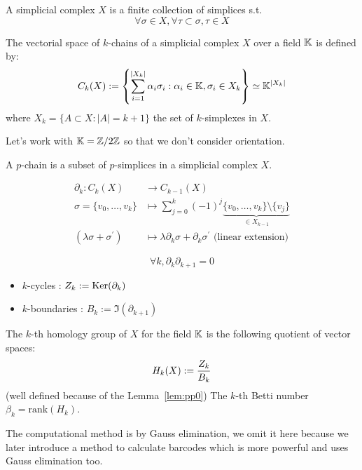 \begin{definition}
  A simplicial complex $X$ is a finite collection of simplices s.t.
  $$
  \forall \sigma\in X, \forall \tau\subset\sigma, \tau\in X
  $$
\end{definition}

\begin{definition}
  The vectorial space of $k$-chains of a simplicial complex $X$ over a field $\mathbb{K}$ is defined by:
  $$
  C_k(X) := \left\{\sum_{i=1}^{\left|X_k\right|} \alpha_i \sigma_i: \alpha_i \in \mathbb{K}, \sigma_i \in X_k\right\}
  \simeq \mathbb{K}^{|X_k|}
  $$
  where $X_k = \{A\subset X : |A|=k+1\}$ the set of $k$-simplexes in $X$.
\end{definition}
\RM Let's work with $\mathbb{K} = \mathbb{Z}/2\mathbb{Z}$ so that we don't consider orientation.

\begin{definition}[$p$-chain]
  A $p$-chain is a subset of $p$-simplices in a simplicial complex $X$.
\end{definition}

\begin{definition}
  $$
  \begin{aligned}
  \partial_k: C_k(X) & \to C_{k-1}(X) \\
  \sigma=\{ v_0, \ldots, v_k \} & \mapsto \sum_{j=0}^k(-1)^j \underbrace{ \{v_0,\ldots,v_k \} \setminus \{v_j\}}_{\in X_{k-1}} \\
  \left(\lambda \sigma+\sigma^{\prime}\right) & \mapsto \lambda \partial_k \sigma+\partial_k \sigma^{\prime} \text{ (linear extension)}
  \end{aligned}
  $$
\end{definition}

\begin{lemma}
  $$
  \forall k, \partial_k \partial_{k+1} = 0
  $$
  \label{lem:pp0}
\end{lemma}

\begin{definition}
  \begin{itemize}
    \item $k$-cycles : $Z_k:=\operatorname{Ker}(\partial_k)$
    \item $k$-boundaries : $B_k:=\Im(\partial_{k+1})$
  \end{itemize}
  The $k$-th homology group of $X$ for the field $\mathbb{K}$ is the following quotient
  of vector spaces:
  $$
  H_k(X):={Z_k\over B_k}
  $$
  (well defined because of the Lemma~\ref{lem:pp0})
  The $k$-th Betti number $\beta_k = \mathrm{rank}(H_k)$.
\end{definition}
\RM The computational method is by Gauss elimination, we omit it here
because we later introduce a method to calculate barcodes which is more
powerful and uses Gauss elimination too.

